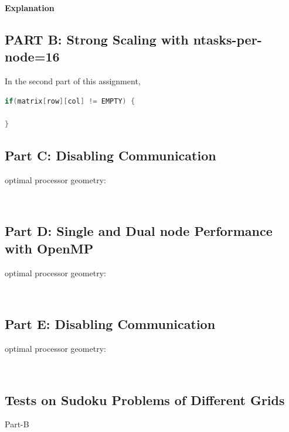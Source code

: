 \documentclass{article}
\newcommand\tab[1][0.5cm]{\hspace*{#1}}
\begin{document}
\textbf{Explanation}
\\

\newpage


\subsection{PART B: Strong Scaling with ntasks-per-node=16}
\tab In the second part of this assignment, 
\begin{lstlisting}[language=C]
if(matrix[row][col] != EMPTY) {

}		
\end{lstlisting}
\newpage

\subsection{Part C: Disabling Communication}
\begin{description}
    \item[optimal processor geometry: ] \hfill \\ 
    
\end{description}

\subsection{Part D: Single and Dual node Performance with OpenMP}
\begin{description}
    \item[optimal processor geometry: ] \hfill \\ 
    
\end{description}

\subsection{Part E: Disabling Communication}
\begin{description}
    \item[optimal processor geometry: ] \hfill \\ 
    
\end{description}

\subsection{Tests on Sudoku Problems of Different Grids}
\begin{description}
\item[Part-B]
\end{description} 
\end{document}
